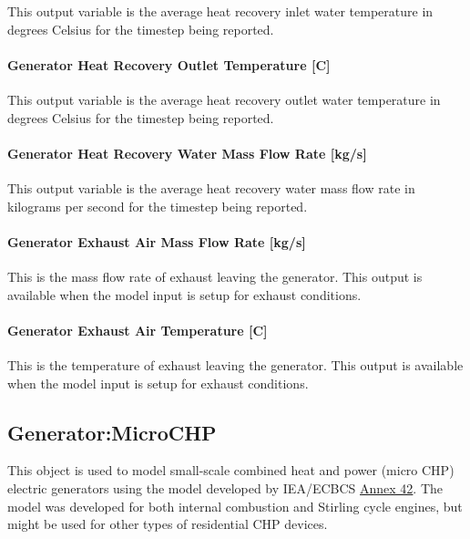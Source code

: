 This output variable is the average heat recovery inlet water temperature in degrees Celsius for the timestep being reported.

\paragraph{Generator Heat Recovery Outlet Temperature {[}C{]}}\label{generator-heat-recovery-outlet-temperature-c-1}

This output variable is the average heat recovery outlet water temperature in degrees Celsius for the timestep being reported.

\paragraph{Generator Heat Recovery Water Mass Flow Rate {[}kg/s{]}}\label{generator-heat-recovery-water-mass-flow-rate-kgs}

This output variable is the average heat recovery water mass flow rate in kilograms per second for the timestep being reported.

\paragraph{Generator Exhaust Air Mass Flow Rate {[}kg/s{]}}\label{generator-exhaust-air-mass-flow-rate-kgs}

This is the mass flow rate of exhaust leaving the generator. This output is available when the model input is setup for exhaust conditions.

\paragraph{Generator Exhaust Air Temperature {[}C{]}}\label{generator-exhaust-air-temperature-c-1}

This is the temperature of exhaust leaving the generator. This output is available when the model input is setup for exhaust conditions.

\subsection{Generator:MicroCHP}\label{generatormicrochp}

This object is used to model small-scale combined heat and power (micro CHP) electric generators using the model developed by IEA/ECBCS \href{http://www.ecbcs.org/annexes/annex42.htm}{Annex 42}. The model was developed for both internal combustion and Stirling cycle engines, but might be used for other types of residential CHP devices.

